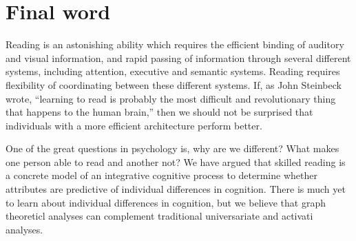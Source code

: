 \section{Final word}


Reading is an astonishing ability which requires the efficient binding of auditory and visual information, and rapid passing of information through several different systems, including attention, executive and semantic systems.  Reading requires flexibility of coordinating between these different systems. If, as John Steinbeck wrote, ``learning to read is probably the most difficult and revolutionary thing that happens to the human brain,'' then we should not be surprised that individuals with a more efficient architecture perform better. 

One of the great questions in psychology is, why are we different? What makes one person able to read and another not? We have argued that skilled reading is a concrete model of an integrative cognitive process to determine whether attributes are predictive of individual differences in cognition. There is much yet to learn about individual differences in cognition, but we believe that graph theoreticl analyses can complement traditional universariate and activati analyses. 